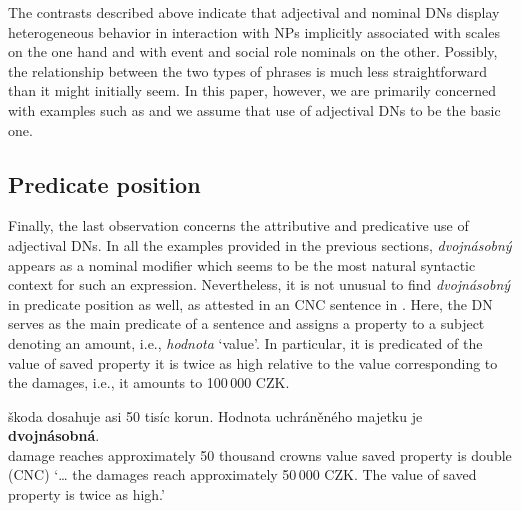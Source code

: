 \documentclass[output=paper,
modfonts,
hidelinks,
newtxmath
]{langscibook}
\begin{document}
\ea\label{dvojnasobny-asymmetry} 
\z \z

\noindent The contrasts described above indicate that adjectival and nominal DNs display heterogeneous behavior in interaction with NPs implicitly associated with scales on the one hand and with event and social role nominals on the other. Possibly, the relationship between the two types of phrases is much less straightforward than it might initially seem. In this paper, however, we are primarily concerned with examples such as  and we assume that use of adjectival DNs to be the basic one.

\subsection{Predicate position}\label{predicate-position}

Finally, the last observation concerns the attributive and predicative use of adjectival DNs. In all the examples provided in the previous sections, \textit{dvojnásobný} appears as a nominal modifier which seems to be the most natural syntactic context for such an expression. Nevertheless, it is not unusual to find \textit{dvojnásobný} in predicate position as well, as attested in an CNC sentence in . Here, the DN serves as the main predicate of a sentence and assigns a property to a subject denoting an amount, i.e., \textit{hodnota} `value'. In particular, it is predicated of the value of saved property it is twice as high relative to the value corresponding to the damages, i.e., it amounts to {100\,000 CZK}.

\ea \gll {\dots} škoda dosahuje asi 50 tisíc korun. Hodnota uchráněného majetku je \textbf{dvojnásobná}.\label{dvojnasobny-predicate}\\
{} damage reaches approximately 50 thousand crowns value saved property is double\\\hfill(CNC)
\glt `{\dots} the damages reach approximately 50\,000 CZK. The value of saved property is twice as high.'
\z
\end{document}
